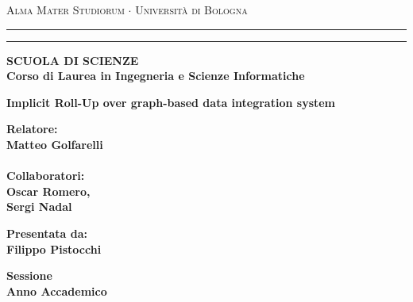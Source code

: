 \documentclass[12pt,a4paper]{report}
\begin{document}
\begin{titlepage}
\begin{center}
{{\Large{\textsc{Alma Mater Studiorum $\cdot$ Universit\`a di
Bologna}}}} \rule[0.1cm]{15.8cm}{0.1mm}
\rule[0.5cm]{15.8cm}{0.6mm}
{\small{\bf SCUOLA DI SCIENZE\\
Corso di Laurea in Ingegneria e Scienze Informatiche }}
\end{center}
\vspace{15mm}
\begin{center}
{\LARGE{\bf Implicit Roll-Up over graph-based data integration system}}\\
\vspace{3mm}
\end{center}
\vspace{40mm}
\par
\noindent
\begin{minipage}[t]{0.47\textwidth}
{\large{\bf Relatore:\\
Matteo Golfarelli\\
\\
Collaboratori:\\
Oscar Romero, \\
Sergi Nadal 
}}
\end{minipage}
\hfill
\begin{minipage}[t]{0.47\textwidth}\raggedleft
{\large{\bf Presentata da:\\
Filippo Pistocchi}}
\end{minipage}
\vspace{20mm}
\begin{center}
{\large{\bf Sessione\\%
Anno Accademico }}%
\end{center}
\end{titlepage}

\tableofcontents
\listoffigures
\listofalgorithms
\end{document}
